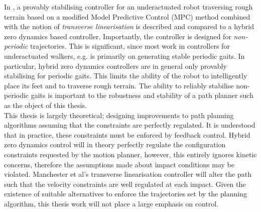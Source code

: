 In \cite{manchester2011stable}, a provably stabilising controller for an underactuated robot traversing rough terrain based on a modified Model Predictive Control (MPC) method combined with the notion of \textit{transverse linearisation} is described and compared to a hybrid zero dynamics based controller. Importantly, the controller is designed for \textit{non-periodic} trajectories. This is significant, since most work in controllers for underactuated walkers, e.g. \cite{martin2014design, sreenath2011compliant, raibert2008bigdog} is primarily on generating stable periodic gaits. In particular, hybrid zero dynamics controllers are in general only provably stabilising for periodic gaits. This limits the ability of the robot to intelligently place its feet and to traverse rough terrain. The ability to reliably stabilise non-periodic gaits is important to the robustness and stability of a path planner such as the object of this thesis. \\

This thesis is largely theoretical; designing improvements to path planning algorithms assuming that the constraints are perfectly regulated. It is understood that in practice, these constraints must be enforced by feedback control. Hybrid zero dynamics control will in theory perfectly regulate the configuration constraints requested by the motion planner, however, this entirely ignores kinetic concerns, therefore the assumptions made about impact conditions may be violated. Manchester et al's transverse linearisation controller will alter the path such that the velocity constraints are well regulated at each impact. Given the existence of suitable alternatives to enforce the trajectories set by the planning algorithm, this thesis work will not place a large emphasis on control.